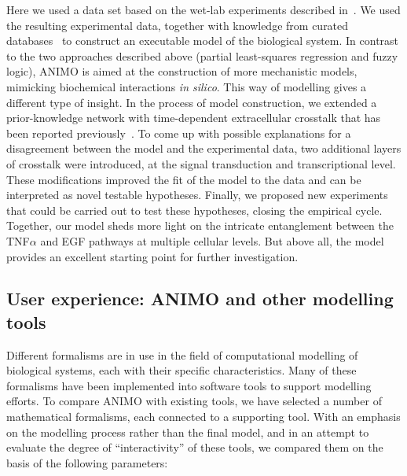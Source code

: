 \documentclass{bmcart}
\begin{document}
Here we used a data set based on the wet-lab experiments described in~\cite{pathway-compendium}. We used the
resulting experimental data, together with knowledge from curated databases~\cite{kegg,phosphosite}
to construct an executable model of the biological system.
In contrast to the two approaches described above (partial least-squares regression and fuzzy logic), ANIMO is aimed at the construction of
more mechanistic models, mimicking biochemical interactions \emph{in silico}. This way of modelling
gives a different type of insight. In the process of model construction, we extended a
prior-knowledge network with time-dependent extracellular crosstalk that has been reported
previously~\cite{pathway-autocrine}. To come up with possible explanations for a disagreement
between the model and the experimental data, two additional layers of
crosstalk were introduced, at the signal transduction and transcriptional level. These modifications
improved the fit of the model to the data and can be interpreted as novel testable hypotheses.
Finally, we proposed new experiments that could be carried out to test these hypotheses, closing the empirical cycle.
Together, our model sheds more light on the intricate
entanglement between the TNF$\alpha$ and EGF pathways at multiple cellular levels.
But above all,  the model provides an excellent starting point for further investigation.


\subsection*{User experience: ANIMO and other modelling tools}\label{suppl:comparison-table}
Different formalisms are in use in the field of computational
modelling of biological systems, each with their specific characteristics.
Many of these formalisms have been implemented into
software tools to support modelling efforts. To compare
ANIMO with existing tools, we have selected a number of mathematical formalisms,
each connected to a supporting tool. With an emphasis on the modelling
process rather than the final model, and in an attempt to
evaluate the degree of ``interactivity'' of these tools, we compared them on
the basis of the following parameters:
\end{document}
